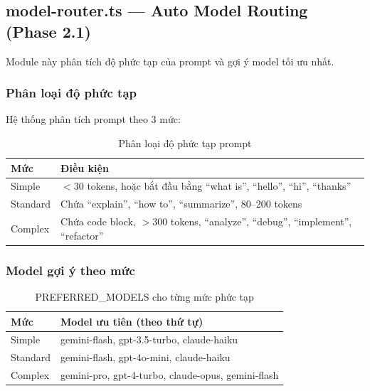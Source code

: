 \documentclass[12pt,a4paper]{article}
\begin{document}
\subsection{model-router.ts — Auto Model Routing (Phase 2.1)}

Module này phân tích độ phức tạp của prompt và gợi ý model tối ưu nhất.

\subsubsection{Phân loại độ phức tạp}

Hệ thống phân tích prompt theo 3 mức:

\begin{table}[h]
    \centering
    \begin{tabular}{lp{8cm}}
        \toprule
        \textbf{Mức} & \textbf{Điều kiện} \\
        \midrule
        Simple & $<30$ tokens, hoặc bắt đầu bằng ``what is'', ``hello'', ``hi'', ``thanks'' \\
        Standard & Chứa ``explain'', ``how to'', ``summarize'', 80--200 tokens \\
        Complex & Chứa code block, $>300$ tokens, ``analyze'', ``debug'', ``implement'', ``refactor'' \\
        \bottomrule
    \end{tabular}
    \caption{Phân loại độ phức tạp prompt}
\end{table}

\subsubsection{Model gợi ý theo mức}

\begin{table}[h]
    \centering
    \begin{tabular}{ll}
        \toprule
        \textbf{Mức} & \textbf{Model ưu tiên (theo thứ tự)} \\
        \midrule
        Simple   & gemini-flash, gpt-3.5-turbo, claude-haiku \\
        Standard & gemini-flash, gpt-4o-mini, claude-haiku \\
        Complex  & gemini-pro, gpt-4-turbo, claude-opus, gemini-flash \\
        \bottomrule
    \end{tabular}
    \caption{PREFERRED\_MODELS cho từng mức phức tạp}
\end{table}
\end{document}
